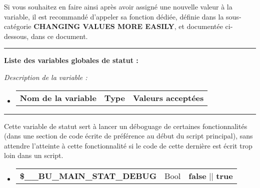 \documentclass[a4paper,10pt]{article}
\begin{document}
\begin{justify}
    Si vous souhaitez en faire ainsi après avoir assigné une nouvelle valeur à la variable, il est recommandé d'appeler sa fonction dédiée, définie dans la sous-catégorie \textbf{\color{green}CHANGING VALUES MORE EASILY}, et documentée ci-dessous, dans ce document.
\end{justify}


\par\noindent\rule{\textwidth}{0.4pt}

\begin{justify}
     \textbf{Liste des variables globales de statut :}
\end{justify}

\begin{justify}
    \textit{Description de la variable :}
\end{justify}

\begin{justify}
     \begin{itemize}
        \item
        {
            \begin{tabular}{l|l|l}
                \textbf{Nom de la variable} & \textbf{Type} & \textbf{Valeurs acceptées}
            \end{tabular}
        }
    \end{itemize}
\end{justify}


\par\noindent\rule{\textwidth}{0.4pt}

\begin{justify}
    Cette variable de statut sert à lancer un déboguage de certaines fonctionnalités (dans une section de code écrite de préférence au début du script principal), sans attendre l'atteinte à cette fonctionnalité si le code de cette dernière est écrit trop loin dans un script.
\end{justify}

\begin{justify}
     \begin{itemize}
        \item
        {
            \begin{tabular}{l|l|l}
                \textbf{\color{orange}\$\_\_BU\_MAIN\_STAT\_DEBUG}  & Bool & \textbf{false} || \textbf{true} \\[1\baselineskip]
            \end{tabular}
        }
    \end{itemize}
\end{justify}
\end{document}
